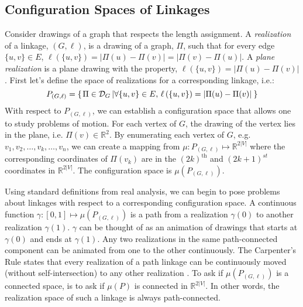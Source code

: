 \documentclass[10pt]{CSUNthesis}
\theoremstyle{plain}%
\theoremstyle{definition}
\theoremstyle{remark}
\newcommand{\DD}{{\cal D}} %
\newcommand{\bbR}{{\mathbb{R}}}
\newcommand{\set}[2]{{\left\lbrace \left.  #1 \left\vert #2  \right.\right.\right\rbrace  }}
\newcommand{\lr}[1]{\left( #1 \right)}
\newcommand{\vlr}[1]{\left\vert #1 \right\vert}
\begin{document}
\subsection{Configuration Spaces of Linkages}

Consider drawings of a graph that respects the length assignment.  
A \textit{realization} of a linkage, $(G,\ell)$, is a drawing of a graph, $\Pi$, such that for every edge $\{u,v\} \in E$, $\ell\left( \{u,v\} \right) = \left\vert \Pi(u) - \Pi(v) \right\vert = \left\vert \Pi(v) - \Pi(u) \right\vert$. 
A \textit{plane realization} is a plane drawing with the property, $\ell\left( \{u,v\} \right) = \left\vert \Pi(u) - \Pi(v) \right\vert$.
First let's define the space of realizations for a corresponding linkage, i.e.:
$$P_{(G,\ell)} = \set{\Pi\in \DD_G }{\forall \{u,v\} \in E\text{, }\ell\left( \{u,v\} \right) = \left\vert \Pi(u) - \Pi(v) \right\vert}$$
With respect to $P_{(G,\ell)}$, we can establish a configuration space that allows one to study problems of motion.  
For each vertex of $G$, the drawing of the vertex lies in the plane, i.e. $\Pi(v) \in \bbR^2$.  
By enumerating each vertex of $G$, e.g. $v_1, v_2, \dots, v_k, \dots, v_{n}$, we can create a mapping from $\mu: P_{(G,\ell)} \mapsto \bbR^{2\vert V \vert}$ where the corresponding coordinates of $\Pi(v_k)$ are in the $(2k)^\text{th}$ and $(2k+1)^{st}$ coordinates in $\bbR^{2\vert V \vert}$.  
The configuration space is $\mu\lr{P_{(G,\ell)}}$.  

Using standard definitions from real analysis, we can begin to pose problems about linkages with respect to a corresponding configuration space.  
A continuous function $\gamma: [0,1]\mapsto \mu\lr{P_{(G,\ell)}}$ is a path from a realization $\gamma(0)$ to another realization $\gamma(1)$.
$\gamma$ can be thought of as an animation of drawings that starts at $\gamma(0)$ and ends at $\gamma(1)$.
Any two realizations in the same path-connected component can be animated from one to the other continuously.
The Carpenter's Rule states that every realization of a path linkage can be continuously moved (without self-intersection) to any other realization \cite{CDR03,Str05}.
To ask if $\mu\lr{P_{(G,\ell)}}$ is a connected space, is to ask if $\mu(P)$ is connected in $\bbR^{2\vert V \vert}$.
In other words, the realization space of such a linkage is always path-connected.
\end{document}
